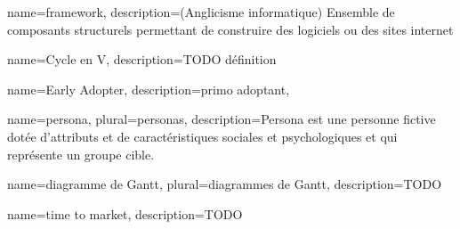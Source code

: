 
\begin{comment}
Glossaire : 
  Nouvelle entrée :
    \newglossaryentry{test} %
    {%
        name={test}, %
        description={<description>}, %
        plural={tests} %
    }
  Usage : 
    \gls{test} Retourne "test"
    \Gls{test} Retourne "Test"
    \glsplural{test} Retourne "tests"
    \Glsplural{test} Retourne "Tests"
        
Pour des mots utilisés fréquemment, petite astuce : 
	\newcommand{\bsr}{bilan scientifique régional} 
Ensuite, dans le contenu, il suffit d'y faire référence comme ceci : "\bsr{}"
\end{comment}


{%
    name={framework},
    description={(Anglicisme informatique) Ensemble de composants structurels permettant de construire des logiciels ou des sites internet}
}

{%
	name={Cycle en V},
	description={TODO définition}
}

{%
	name={Early Adopter},
	description={primo adoptant},
}

{
	name={persona},
	plural={personas},
	description={Persona est une personne fictive dotée d'attributs et de caractéristiques sociales et psychologiques et qui représente un groupe cible. }
}

{
	name={diagramme de Gantt},
	plural={diagrammes de Gantt},
	description={TODO}
}

{
	name={time to market},
	description={TODO}
}





